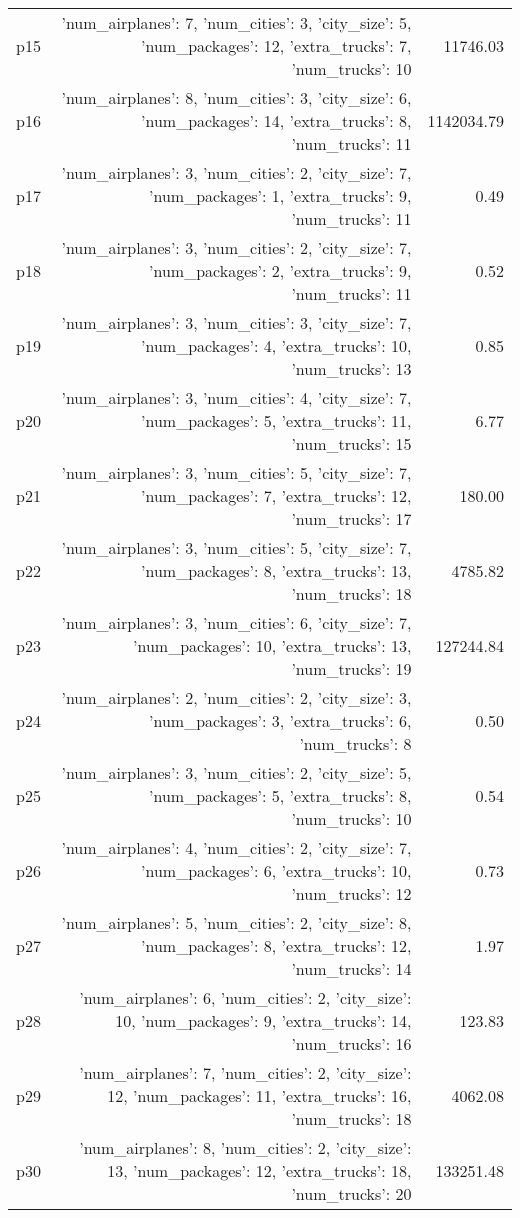 \documentclass{article}
\begin{document}
\begin{center}
\begin{tabular}{@{}l|r|r@{}}
  p15&{'num\_airplanes': 7, 'num\_cities': 3, 'city\_size': 5, 'num\_packages': 12, 'extra\_trucks': 7, 'num\_trucks': 10}&11746.03\\
  p16&{'num\_airplanes': 8, 'num\_cities': 3, 'city\_size': 6, 'num\_packages': 14, 'extra\_trucks': 8, 'num\_trucks': 11}&1142034.79\\
  p17&{'num\_airplanes': 3, 'num\_cities': 2, 'city\_size': 7, 'num\_packages': 1, 'extra\_trucks': 9, 'num\_trucks': 11}&0.49\\
  p18&{'num\_airplanes': 3, 'num\_cities': 2, 'city\_size': 7, 'num\_packages': 2, 'extra\_trucks': 9, 'num\_trucks': 11}&0.52\\
  p19&{'num\_airplanes': 3, 'num\_cities': 3, 'city\_size': 7, 'num\_packages': 4, 'extra\_trucks': 10, 'num\_trucks': 13}&0.85\\
  p20&{'num\_airplanes': 3, 'num\_cities': 4, 'city\_size': 7, 'num\_packages': 5, 'extra\_trucks': 11, 'num\_trucks': 15}&6.77\\
  p21&{'num\_airplanes': 3, 'num\_cities': 5, 'city\_size': 7, 'num\_packages': 7, 'extra\_trucks': 12, 'num\_trucks': 17}&180.00\\
  p22&{'num\_airplanes': 3, 'num\_cities': 5, 'city\_size': 7, 'num\_packages': 8, 'extra\_trucks': 13, 'num\_trucks': 18}&4785.82\\
  p23&{'num\_airplanes': 3, 'num\_cities': 6, 'city\_size': 7, 'num\_packages': 10, 'extra\_trucks': 13, 'num\_trucks': 19}&127244.84\\
  p24&{'num\_airplanes': 2, 'num\_cities': 2, 'city\_size': 3, 'num\_packages': 3, 'extra\_trucks': 6, 'num\_trucks': 8}&0.50\\
  p25&{'num\_airplanes': 3, 'num\_cities': 2, 'city\_size': 5, 'num\_packages': 5, 'extra\_trucks': 8, 'num\_trucks': 10}&0.54\\
  p26&{'num\_airplanes': 4, 'num\_cities': 2, 'city\_size': 7, 'num\_packages': 6, 'extra\_trucks': 10, 'num\_trucks': 12}&0.73\\
  p27&{'num\_airplanes': 5, 'num\_cities': 2, 'city\_size': 8, 'num\_packages': 8, 'extra\_trucks': 12, 'num\_trucks': 14}&1.97\\
  p28&{'num\_airplanes': 6, 'num\_cities': 2, 'city\_size': 10, 'num\_packages': 9, 'extra\_trucks': 14, 'num\_trucks': 16}&123.83\\
  p29&{'num\_airplanes': 7, 'num\_cities': 2, 'city\_size': 12, 'num\_packages': 11, 'extra\_trucks': 16, 'num\_trucks': 18}&4062.08\\
  p30&{'num\_airplanes': 8, 'num\_cities': 2, 'city\_size': 13, 'num\_packages': 12, 'extra\_trucks': 18, 'num\_trucks': 20}&133251.48
                            \end{tabular}
                            \end{center}
                    
\end{document}
